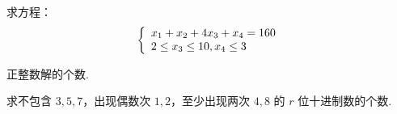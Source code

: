 \documentclass[cn, hazy, blue, normal, 12pt]{elegantnote}
\begin{document}
\begin{exercise}

    求方程：
    \begin{equation}
        \notag
        \left\{\begin{array}{l}
            x_{1}+x_{2}+4 x_{3}+x_{4}=160 \\
            2 \leq x_{3} \leq 10, x_{4} \leq 3
        \end{array}\right.
    \end{equation}

    正整数解的个数.

\end{exercise}

\begin{exercise}

    求不包含 $3, 5, 7$，出现偶数次 $1, 2$，至少出现两次 $4, 8$ 的 $r$ 位十进制数的个数.

\end{exercise}
\end{document}
